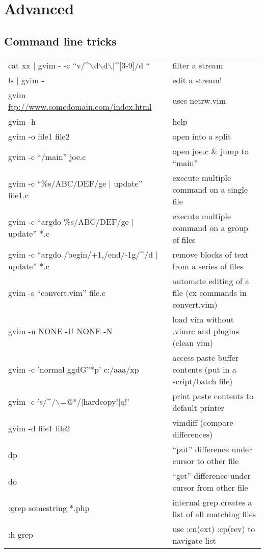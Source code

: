 \section{Advanced}

\subsection{Command line tricks}
\begin{center}
\begin{longtable}{l|l}
cat xx $|$ gvim - -c ``v/\^{}$\backslash$d$\backslash$d$\backslash$$|$\^{}[3-9]/d `` & filter a stream\\
ls $|$ gvim - & edit a stream!\\
gvim \url{ftp://www.somedomain.com/index.html} & uses netrw.vim\\
gvim -h & help\\
gvim -o file1 file2 & open into a split\\
gvim -c ``/main'' joe.c & open joe.c \& jump to ``main''\\
gvim -c ``\%s/ABC/DEF/ge $|$ update'' file1.c & execute multiple command on a single file\\
gvim -c ``argdo \%s/ABC/DEF/ge $|$ update'' *.c & execute multiple command on a group of files\\
gvim -c ``argdo /begin/+1,/end/-1g/\^{}/d $|$ update'' *.c & remove blocks of text from a series of files\\
gvim -s ``convert.vim'' file.c & automate editing of a file (ex commands in convert.vim)\\
gvim -u NONE -U NONE -N & load vim without .vimrc and plugins (clean vim)\\
gvim -c 'normal ggdG''*p' c:/aaa/xp & access paste buffer contents (put in a script/batch file)\\
gvim -c 's/\^{}/$\backslash$=@*/$|$hardcopy!$|$q!' & print paste contents to default printer\\
gvim -d file1 file2 & vimdiff (compare differences)\\
dp & ``put'' difference under cursor to other file\\
do & ``get'' difference under cursor from other file\\
:grep somestring *.php & internal grep creates a list of all matching files\\
:h grep & use :cn(ext) :cp(rev) to navigate list
\end{longtable}
\end{center}

